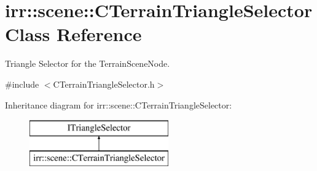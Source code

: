 \hypertarget{classirr_1_1scene_1_1_c_terrain_triangle_selector}{\section{irr\-:\-:scene\-:\-:C\-Terrain\-Triangle\-Selector Class Reference}
\label{classirr_1_1scene_1_1_c_terrain_triangle_selector}
}


Triangle Selector for the Terrain\-Scene\-Node.  




{\ttfamily \#include $<$C\-Terrain\-Triangle\-Selector.\-h$>$}

Inheritance diagram for irr\-:\-:scene\-:\-:C\-Terrain\-Triangle\-Selector\-:\begin{figure}[H]
\begin{center}
\leavevmode
\includegraphics[height=2.000000cm]{classirr_1_1scene_1_1_c_terrain_triangle_selector}
\end{center}
\end{figure}
